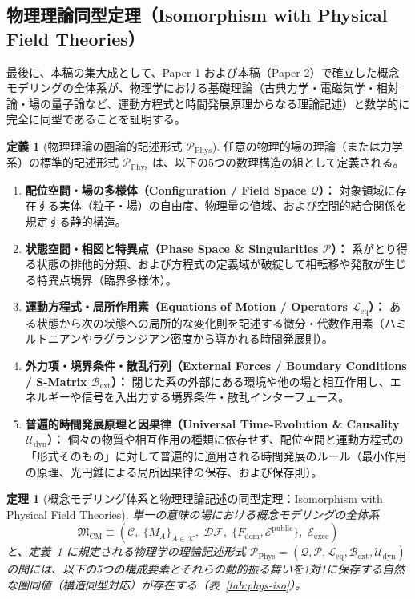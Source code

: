 \documentclass[11pt,a4paper]{ltjsarticle}
\theoremstyle{definition}
\newtheorem{definition}{定義}[section]
\theoremstyle{plain}
\newtheorem{theorem}{定理}[section]
\theoremstyle{remark}
\newcommand{\DF}{\mathcal{DF}}
\begin{document}
\subsection{物理理論同型定理（Isomorphism with Physical Field Theories）}\label{sec:phys-iso}
最後に、本稿の集大成として、Paper 1 および本稿（Paper 2）で確立した概念モデリングの全体系が、物理学における基礎理論（古典力学・電磁気学・相対論・場の量子論など、運動方程式と時間発展原理からなる理論記述）と数学的に完全に同型であることを証明する。

\begin{definition}[物理理論の圏論的記述形式 $\mathcal{P}_{\mathrm{Phys}}$]\label{def:phys-theory}
任意の物理的場の理論（または力学系）の標準的記述形式 $\mathcal{P}_{\mathrm{Phys}}$ は、以下の5つの数理構造の組として定義される。
\begin{enumerate}
    \item \textbf{配位空間・場の多様体（Configuration / Field Space $\mathcal{Q}$）：} 対象領域に存在する実体（粒子・場）の自由度、物理量の値域、および空間的結合関係を規定する静的構造。
    \item \textbf{状態空間・相図と特異点（Phase Space \& Singularities $\mathcal{P}$）：} 系がとり得る状態の排他的分類、および方程式の定義域が破綻して相転移や発散が生じる特異点境界（臨界多様体）。
    \item \textbf{運動方程式・局所作用素（Equations of Motion / Operators $\mathcal{L}_{\mathrm{eq}}$）：} ある状態から次の状態への局所的な変化則を記述する微分・代数作用素（ハミルトニアンやラグランジアン密度から導かれる時間発展則）。
    \item \textbf{外力項・境界条件・散乱行列（External Forces / Boundary Conditions / S-Matrix $\mathcal{B}_{\mathrm{ext}}$）：} 閉じた系の外部にある環境や他の場と相互作用し、エネルギーや信号を入出力する境界条件・散乱インターフェース。
    \item \textbf{普遍的時間発展原理と因果律（Universal Time-Evolution \& Causality $\mathcal{U}_{\mathrm{dyn}}$）：} 個々の物質や相互作用の種類に依存せず、配位空間と運動方程式の「形式そのもの」に対して普遍的に適用される時間発展のルール（最小作用の原理、光円錐による局所因果律の保存、および保存則）。
\end{enumerate}
\end{definition}

\begin{theorem}[概念モデリング体系と物理理論記述の同型定理：Isomorphism with Physical Field Theories]\label{thm:phys-iso}
単一の意味の場における概念モデリングの全体系
\begin{equation}
\mathfrak{M}_{\mathrm{CM}} \equiv \left(\mathcal{C},\; \{M_A\}_{A \in \mathcal{K}},\; \DF,\; \{F_{\mathrm{dom}}, \mathcal{E}^{\mathrm{public}}\},\; \mathcal{E}_{\mathrm{exec}}\right)
\end{equation}
と、定義~\ref{def:phys-theory} に規定される物理学の理論記述形式 $\mathcal{P}_{\mathrm{Phys}} = (\mathcal{Q}, \mathcal{P}, \mathcal{L}_{\mathrm{eq}}, \mathcal{B}_{\mathrm{ext}}, \mathcal{U}_{\mathrm{dyn}})$ の間には、以下の5つの構成要素とそれらの動的振る舞いを1対1に保存する自然な圏同値（構造同型対応）が存在する（表~\ref{tab:phys-iso}）。
\end{theorem}
\end{document}

